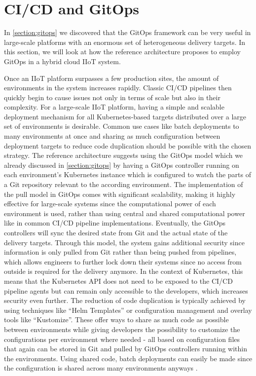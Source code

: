 \section{CI/CD and GitOps}
\label{section:architecture-gitops}
    In \autoref{section:gitops} we discovered that the GitOps framework can be very useful in large-scale platforms with an enormous set of heterogeneous delivery targets. In this section, we will look at how the reference architecture proposes to employ GitOps in a hybrid cloud IIoT system.

    Once an IIoT platform surpasses a few production sites, the amount of environments in the system increases rapidly. Classic CI/CD pipelines then quickly begin to cause issues not only in terms of scale but also in their complexity. For a large-scale IIoT platform, having a simple and scalable deployment mechanism for all Kubernetes-based targets distributed over a large set of environments is desirable. Common use cases like batch deployments to many environments at once and sharing as much configuration between deployment targets to reduce code duplication should be possible with the chosen strategy. The reference architecture suggests using the GitOps model which we already discussed in \autoref{section:gitops} by having a GitOps controller running on each environment's Kubernetes instance which is configured to watch the parts of a Git repository relevant to the according environment. The implementation of the pull model in GitOps comes with significant scalability, making it highly effective for large-scale systems since the computational power of each environment is used, rather than using central and shared computational power like in common CI/CD pipeline implementations. Eventually, the GitOps controllers will sync the desired state from Git and the actual state of the delivery targets. Through this model, the system gains additional security since information is only pulled from Git rather than being pushed from pipelines, which allows engineers to further lock down their systems since no access from outside is required for the delivery anymore. In the context of Kubernetes, this means that the Kubernetes API does not need to be exposed to the CI/CD pipeline agents but can remain only accessible to the developers, which increases security even further. The reduction of code duplication is typically achieved by using techniques like ``Helm Templates'' or configuration management and overlay tools like ``Kustomize''. These offer ways to share as much code as possible between environments while giving developers the possibility to customize the configurations per environment where needed - all based on configuration files that again can be stored in Git and pulled by GitOps controllers running within the environments. Using shared code, batch deployments can easily be made since the configuration is shared across many environments anyways \cite{building_iiot}.\newline

